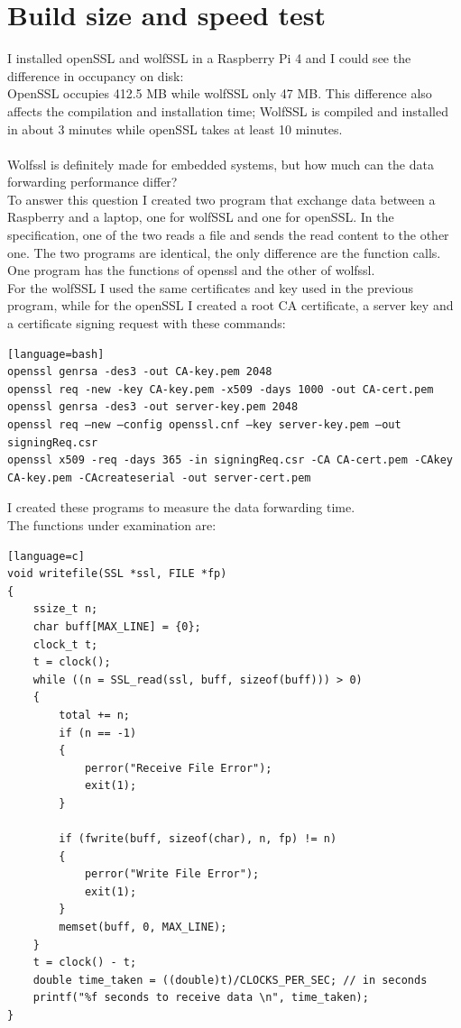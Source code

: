 \documentclass[a4paper,12pt]{report}
\begin{document}
\section{Build size and speed test}
I installed openSSL and wolfSSL in a Raspberry Pi 4 and I could see the difference in occupancy on disk:
\\OpenSSL occupies 412.5 MB while wolfSSL only 47 MB. This difference also affects the compilation and installation time; WolfSSL is compiled and installed in about 3 minutes while openSSL takes at least 10 minutes.
\\\\Wolfssl is definitely made for embedded systems, but how much can the data forwarding performance differ?
\\To answer this question I created two program that exchange data between a Raspberry and a laptop, one for wolfSSL and one for openSSL. In the specification, one of the two reads a file and sends the read content to the other one.
The two programs are identical, the only difference are the function calls. One program has the functions of openssl and the other of wolfssl.
\\For the wolfSSL I used the same certificates and key used in the previous program, while for the openSSL I created a root CA certificate, a server key and a certificate signing request with these commands:
\begin{lstlisting}[caption={openSSL commands},captionpos=b][language=bash]
openssl genrsa -des3 -out CA-key.pem 2048
openssl req -new -key CA-key.pem -x509 -days 1000 -out CA-cert.pem
openssl genrsa -des3 -out server-key.pem 2048
openssl req –new –config openssl.cnf –key server-key.pem –out signingReq.csr
openssl x509 -req -days 365 -in signingReq.csr -CA CA-cert.pem -CAkey CA-key.pem -CAcreateserial -out server-cert.pem
\end{lstlisting}

I created these programs to measure the data forwarding time.
\\The functions under examination are:

\begin{lstlisting}[caption={openSSL function},captionpos=b][language=c]
void writefile(SSL *ssl, FILE *fp)
{
    ssize_t n;
    char buff[MAX_LINE] = {0};
    clock_t t; 
    t = clock(); 
    while ((n = SSL_read(ssl, buff, sizeof(buff))) > 0)
    {
        total += n;
        if (n == -1)
        {
            perror("Receive File Error");
            exit(1);
        }

        if (fwrite(buff, sizeof(char), n, fp) != n)
        {
            perror("Write File Error");
            exit(1);
        }
        memset(buff, 0, MAX_LINE);
    }
    t = clock() - t; 
    double time_taken = ((double)t)/CLOCKS_PER_SEC; // in seconds 
    printf("%f seconds to receive data \n", time_taken); 
}
\end{lstlisting}
\end{document}
